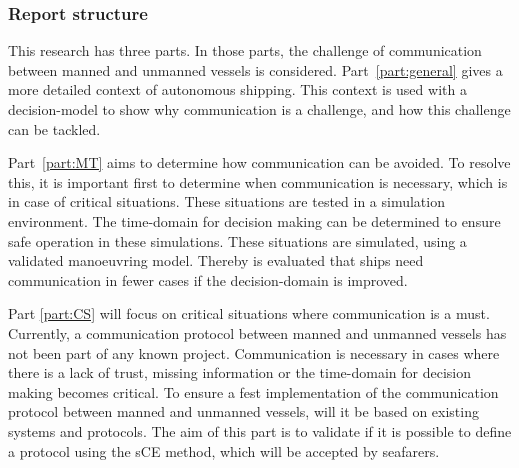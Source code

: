 \subsubsection*{Report structure}
This research has three parts. In those parts, the challenge of communication between manned and unmanned vessels is considered. Part~\ref{part:general} gives a more detailed context of autonomous shipping. This context is used with a decision-model to show why communication is a challenge, and how this challenge can be tackled.

Part~\ref{part:MT} aims to determine how communication can be avoided. To resolve this, it is important first to determine when communication is necessary, which is in case of critical situations. These situations are tested in a simulation environment. The time-domain for decision making can be determined to ensure safe operation in these simulations. These situations are simulated, using a validated manoeuvring model. Thereby is evaluated that ships need communication in fewer cases if the decision-domain is improved.

Part \ref{part:CS} will focus on critical situations where communication is a must. Currently, a communication protocol between manned and unmanned vessels has not been part of any known project. Communication is necessary in cases where there is a lack of trust, missing information or the time-domain for decision making becomes critical. To ensure a fest implementation of the communication protocol between manned and unmanned vessels, will it be based on existing systems and protocols. The aim of this part is to validate if it is possible to define a protocol using the \acf{sCE} method, which will be accepted by seafarers.
